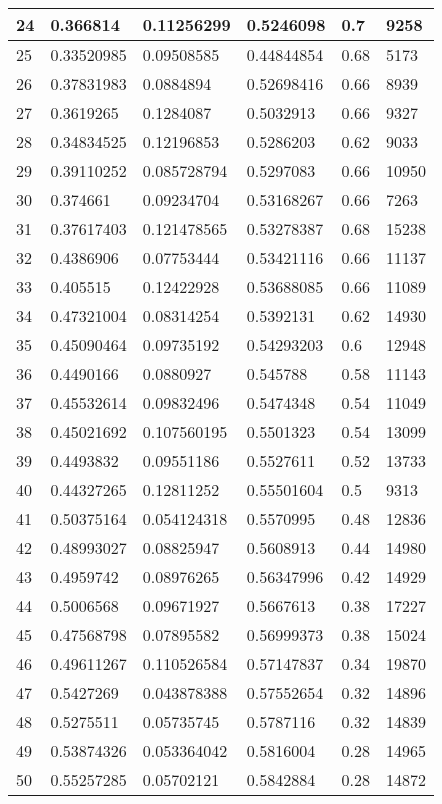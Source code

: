 \begin{longtable}{|l|l|l|l|l|l|}
24 & 0.366814 & 0.11256299 & 0.5246098 & 0.7 & 9258 \\ \hline 
25 & 0.33520985 & 0.09508585 & 0.44844854 & 0.68 & 5173 \\ \hline 
26 & 0.37831983 & 0.0884894 & 0.52698416 & 0.66 & 8939 \\ \hline 
27 & 0.3619265 & 0.1284087 & 0.5032913 & 0.66 & 9327 \\ \hline 
28 & 0.34834525 & 0.12196853 & 0.5286203 & 0.62 & 9033 \\ \hline 
29 & 0.39110252 & 0.085728794 & 0.5297083 & 0.66 & 10950 \\ \hline 
30 & 0.374661 & 0.09234704 & 0.53168267 & 0.66 & 7263 \\ \hline 
31 & 0.37617403 & 0.121478565 & 0.53278387 & 0.68 & 15238 \\ \hline 
32 & 0.4386906 & 0.07753444 & 0.53421116 & 0.66 & 11137 \\ \hline 
33 & 0.405515 & 0.12422928 & 0.53688085 & 0.66 & 11089 \\ \hline 
34 & 0.47321004 & 0.08314254 & 0.5392131 & 0.62 & 14930 \\ \hline 
35 & 0.45090464 & 0.09735192 & 0.54293203 & 0.6 & 12948 \\ \hline 
36 & 0.4490166 & 0.0880927 & 0.545788 & 0.58 & 11143 \\ \hline 
37 & 0.45532614 & 0.09832496 & 0.5474348 & 0.54 & 11049 \\ \hline 
38 & 0.45021692 & 0.107560195 & 0.5501323 & 0.54 & 13099 \\ \hline 
39 & 0.4493832 & 0.09551186 & 0.5527611 & 0.52 & 13733 \\ \hline 
40 & 0.44327265 & 0.12811252 & 0.55501604 & 0.5 & 9313 \\ \hline 
41 & 0.50375164 & 0.054124318 & 0.5570995 & 0.48 & 12836 \\ \hline 
42 & 0.48993027 & 0.08825947 & 0.5608913 & 0.44 & 14980 \\ \hline 
43 & 0.4959742 & 0.08976265 & 0.56347996 & 0.42 & 14929 \\ \hline 
44 & 0.5006568 & 0.09671927 & 0.5667613 & 0.38 & 17227 \\ \hline 
45 & 0.47568798 & 0.07895582 & 0.56999373 & 0.38 & 15024 \\ \hline 
46 & 0.49611267 & 0.110526584 & 0.57147837 & 0.34 & 19870 \\ \hline 
47 & 0.5427269 & 0.043878388 & 0.57552654 & 0.32 & 14896 \\ \hline 
48 & 0.5275511 & 0.05735745 & 0.5787116 & 0.32 & 14839 \\ \hline 
49 & 0.53874326 & 0.053364042 & 0.5816004 & 0.28 & 14965 \\ \hline 
50 & 0.55257285 & 0.05702121 & 0.5842884 & 0.28 & 14872 \\ \hline 
\end{longtable}